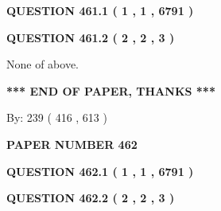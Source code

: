 \documentclass[12pt]{article}
\begin{document}
{\textbf{\Large{QUESTION
461.1 
 ( 1 , 1 , 6791 )
}}}
  
  
  
\vspace{0.2in}
  
{\textbf{\Large{QUESTION
461.2 
 ( 2 , 2 , 3 )
}}}
  
  
 
 
\noindent{}
 
 
 None of above.
 
 
 
 
   
   
 \vspace{0.2in}
 
   
   
   
   
\vspace{1.0in} 
{\textbf{\large{ *** END OF PAPER, THANKS *** }}} 
   
   
\hspace{1.0in} By: 
 239 ( 416 ,  613 )
   
   
   
   
\newpage 
\setcounter{page}{ 
   462001 } 
   
   
   
   
 {\textbf{ \Large{ PAPER NUMBER  462  }}}
   
   
\vspace{0.2in}
   
   
   
   
   
   
 \vspace{0.2in}
 
 
 
 
   
   
  
\vspace{0.2in}
  
{\textbf{\Large{QUESTION
462.1 
 ( 1 , 1 , 6791 )
}}}
  
  
  
\vspace{0.2in}
  
{\textbf{\Large{QUESTION
462.2 
 ( 2 , 2 , 3 )
}}}
  
  
 
 
\noindent{}
 
\end{document}
